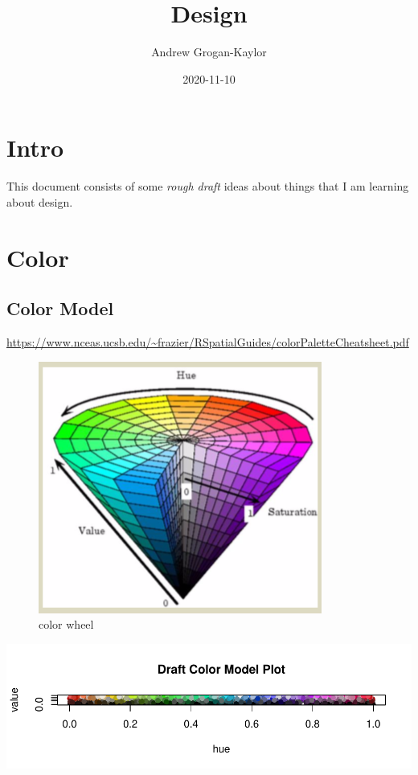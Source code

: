\documentclass[
]{article}
\title{Design}
\author{Andrew Grogan-Kaylor}
\date{2020-11-10}
\begin{document}
\maketitle

{
\setcounter{tocdepth}{2}
\tableofcontents
}
\hypertarget{intro}{%
\section{Intro}\label{intro}}

This document consists of some \emph{rough draft} ideas about things
that I am learning about design.

\hypertarget{color}{%
\section{Color}\label{color}}

\hypertarget{color-model}{%
\subsection{Color Model}\label{color-model}}

\url{https://www.nceas.ucsb.edu/~frazier/RSpatialGuides/colorPaletteCheatsheet.pdf}

\begin{figure}
\centering
\includegraphics{colorwheel.png}
\caption{color wheel}
\end{figure}

\includegraphics{design_files/figure-latex/unnamed-chunk-1-1.pdf}
\end{document}
